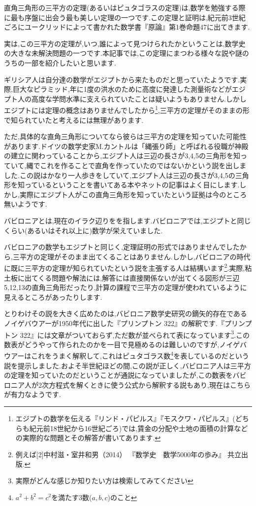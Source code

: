 \documentclass[./main]{subfiles}
\begin{document}

直角三角形の三平方の定理(あるいはピュタゴラスの定理)は,数学を勉強する際に最も序盤に出会う最も美しい定理の一つです.この定理と証明は,紀元前3世紀ごろにユークリッドによって書かれた数学書『原論』第1巻命題47に出てきます.

実は,この三平方の定理が,いつ,誰によって見つけられたかということは,数学史の大きな未解決問題の一つです.本記事では,この定理にまつわる様々な説や謎のうちの一部を紹介したいと思います.


ギリシア人は自分達の数学がエジプトから来たものだと思っていたようです.実際,巨大なピラミッド,年に1度の洪水のために高度に発達した測量術などがエジプト人の高度な学問水準に支えられていたことは疑いようもありません.しかしエジプトには定理の概念はありませんでしたから\footnote{エジプトの数学を伝える『リンド・パピルス』『モスクワ・パピルス』(どちらも紀元前18世紀から16世紀ごろ)では,賃金の分配や土地の面積の計算などの実際的な問題とその解答が書いてあります.},三平方の定理がそのままの形で知られていたと考えるには無理があります.

ただ,具体的な直角三角形についてなら彼らは三平方の定理を知っていた可能性があります.ドイツの数学史家M.カントルは「縄張り師」と呼ばれる役職が神殿の建立に関わっていることから,エジプト人は三辺の長さが3,4,5の三角形を知っていて,縄でこれを作ることで直角を作っていたのではないかという説を出しました.この説はかなり一人歩きをしていて,エジプト人は三辺の長さが3,4,5の三角形を知っているということを書いてある本やネットの記事はよく目にします.しかし,実際にエジプト人がこの直角三角形を知っていたという証拠は今のところ無いようです.


バビロニアとは,現在のイラク辺りをを指します.バビロニアでは,エジプトと同じくらい(あるいはそれ以上に)数学が栄えていました.

バビロニアの数学もエジプトと同じく,定理証明の形式ではありませんでしたから,三平方の定理がそのまま出てくることはありません.しかし,バビロニアの時代に既に三平方の定理が知られていたという説を主張する人は結構います\footnote{例えば[2]中村滋・室井和男（2014） 『数学史　数学5000年の歩み』 共立出版.}.実際,粘土板に出てくる問題や解法には,解答には直接関係ないが出てくる図形が三辺5,12,13の直角三角形だったり,計算の課程で三平方の定理が使われているように見えるところがあったりします.

とりわけその説を大きく広めたのは,バビロニア数学史研究の鏑矢的存在であるノイゲバウアーが1950年代に出した『プリンプトン 322』の解釈です.『プリンプトン 322』には文章がついておらず,ただ数が並べられて表になっています\footnote{実際がどんな感じか知りたい方は検索してみてください}.この数表がどうやって作られたのかを一目で見極めるのは難しいのですが,ノイゲバウアーはこれをうまく解釈して,これはピュタゴラス数\footnote{$a^2 + b^2 = c^2$を満たす3数($a,b,c$)のこと}を表しているのだという説を提示しました.およそ半世紀ほどの間,この説が正しく,バビロニア人は三平方の定理を知っていたのだということが通説になっていましたが,この数表をバビロニア人が2次方程式を解くときに使う公式から解釈する説もあり,現在はこちらが有力なようです.
\end{document}

